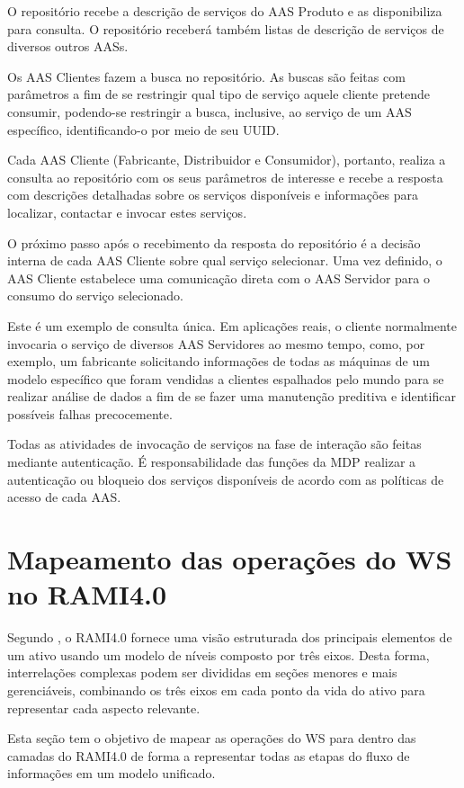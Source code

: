 	O repositório recebe a descrição de serviços do AAS Produto e as disponibiliza para consulta. O repositório receberá também listas de descrição de serviços de diversos outros AASs.
	
	Os AAS Clientes fazem a busca no repositório. As buscas são feitas com parâmetros a fim de se restringir qual tipo de serviço aquele cliente pretende consumir, podendo-se restringir a busca, inclusive, ao serviço de um AAS específico, identificando-o por meio de seu UUID.
	
	Cada AAS Cliente (Fabricante, Distribuidor e Consumidor), portanto, realiza a consulta ao repositório com os seus parâmetros de interesse e recebe a resposta com descrições detalhadas sobre os serviços disponíveis e informações para localizar, contactar e invocar estes serviços.
	
	O próximo passo após o recebimento da resposta do repositório é a decisão interna de cada AAS Cliente sobre qual serviço selecionar. Uma vez definido, o AAS Cliente estabelece uma comunicação direta com o AAS Servidor para o consumo do serviço selecionado.
	
	Este é um exemplo de consulta única. Em aplicações reais, o cliente normalmente invocaria o serviço de diversos AAS Servidores ao mesmo tempo, como, por exemplo, um fabricante solicitando informações de todas as máquinas de um modelo específico que foram vendidas a clientes espalhados pelo mundo para se realizar análise de dados a fim de se fazer uma manutenção preditiva e identificar possíveis falhas precocemente.
	
	Todas as atividades de invocação de serviços na fase de interação são feitas mediante autenticação. É responsabilidade das funções da MDP realizar a autenticação ou bloqueio dos serviços disponíveis de acordo com as políticas de acesso de cada AAS.
	
\section{Mapeamento das operações do WS no RAMI4.0}
	
	Segundo , o RAMI4.0 fornece uma visão estruturada dos principais elementos de um ativo usando um modelo de níveis composto por três eixos. Desta forma, interrelações complexas podem ser divididas em seções menores e mais gerenciáveis, combinando os três eixos em cada ponto da vida do ativo para representar cada aspecto relevante.
	
	Esta seção tem o objetivo de mapear as operações do WS para dentro das camadas do RAMI4.0 de forma a representar todas as etapas do fluxo de informações em um modelo unificado.
	
